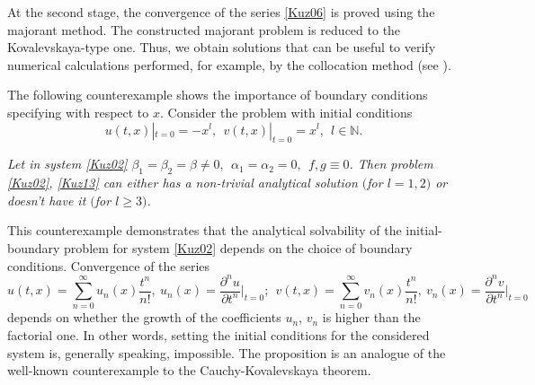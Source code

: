 \documentclass[12pt]{llncs}
\begin{document}
At the second stage, the convergence of the series \eqref{Kuz06} is proved using the majorant method. The constructed majorant problem is reduced to the Kovalevskaya-type one. Thus, we obtain solutions that can be useful to verify numerical calculations performed, for example, by the collocation method (see \cite{KazKuzSpev2021}).

The following counterexample shows the importance of  boundary conditions specifying with respect to $x$. Consider the problem with initial conditions
\begin{equation}\label{Kuz13}
u(t,x)|_{t=0}=-x^l,~~v(t,x)|_{t=0}=x^l,~~l\in\mathbb{N}.
\end{equation}

 {\it Let in system \eqref{Kuz02} $\beta_{1}=\beta_{2}=\beta\neq0,~~\alpha_{1}=\alpha_{2}=0,~~f,g\equiv0$.
	Then problem \eqref{Kuz02}, \eqref{Kuz13} can either has a non-trivial analytical solution $($for $l=1,2$$)$ or doesn't have it $($for $l\geq3$$)$.}

This counterexample demonstrates that the analytical solvability of the initial-boundary problem for system \eqref{Kuz02} depends on the choice of boundary conditions. Convergence of the series
\begin{equation}\label{Kuz14}
u(t,x)=\sum\limits_{n=0}^{\infty}u_n(x)\frac{t^n}{n!},~u_n(x)=\frac{\partial^nu}{\partial t^n}\Big|_{t=0}; ~~v(t,x)=\sum\limits_{n=0}^{\infty}v_n(x)\frac{t^n}{n!},~v_n(x)=\frac{\partial^nv}{\partial t^n}\Big|_{t=0}
\end{equation}
depends on whether the growth of the coefficients $u_n$, $v_n$ is higher than the factorial one. In other words, setting the initial conditions for the considered system is, generally speaking, impossible. The proposition is an analogue of the well-known counterexample to the Cauchy-Kovalevskaya theorem.
\end{document}
